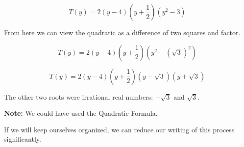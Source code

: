 \documentclass{ximera}
\begin{document}
\begin{explanation}
\[
T(y) = 2 (y-4) \left(y+\frac{1}{2}\right) (y^2  - 3)
\]


From here we can view the quadratic as a difference of two squares and factor. 



\[
T(y) = 2 (y-4) \left(y+\frac{1}{2}\right) (y^2 - (\sqrt{3})^2)
\]



\[
T(y) = 2 (y-4) \left(y+\frac{1}{2}\right) (y - \sqrt{3}) (y + \sqrt{3})
\]


The other two roots were irrational real numbers: $-\sqrt{3}$ and $\sqrt{3}$.



\textbf{Note:} We could have used the Quadratic Formula.


\end{explanation}

If we will keep ourselves organized, we can reduce our writing of this process significantly. \\
\end{document}
